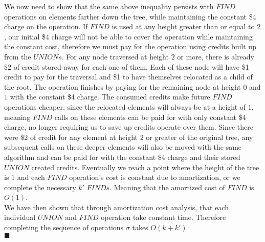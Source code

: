 \documentclass[20pt]{article}
\begin{document}
\begin{text}
    \noindent
    We now need to show that the same above inequality persists with $FIND$ operations on elements farther down the tree, while maintaining the constant \$4 charge on the operation. If $FIND$ is used at any height greater than or equal to $2$, our initial \$4 charge will not be able to cover the operation while maintaining the constant cost, therefore we must pay for the operation using credits built up from the $UNIONs$. For any node traversed at height $2$ or more, there is already \$2 of credit stored away for each one of them. Each of these node will have \$1 credit to pay for the traversal and \$1 to have themselves relocated as a child of the root. The operation finishes by paying for the remaining node at height $0$ and $1$ with the constant \$4 charge. The consumed credits make future $FIND$ operations cheaper, since the relocated elements will always be at a height of $1$, meaning $FIND$ calls on these elements can be paid for with only constant \$4 charge, no longer requiring us to save up credits operate over them. Since there were \$2 of credit for any element at height 2 or greater of the original tree, any subsequent calls on these deeper elements will also be moved with the same algorithm and can be paid for with the constant \$4 charge and their stored $UNION$ created credits. Eventually we reach a point where the height of the tree is $1$ and each $FIND$ operation's cost is constant due to amortization, or we complete the necessary $k'$ $FINDs$. Meaning that the amortized cost of $FIND$ is $O(1)$.\\
    
    \noindent
    We have then shown that through amortization cost analysis, that each individual $UNION$ and $FIND$ operation take constant time. Therefore completing the sequence of operations $\sigma$ takes $O(k + k')$.\\
    
    \hfill $\blacksquare$
\end{text}


\newpage
\end{document}
